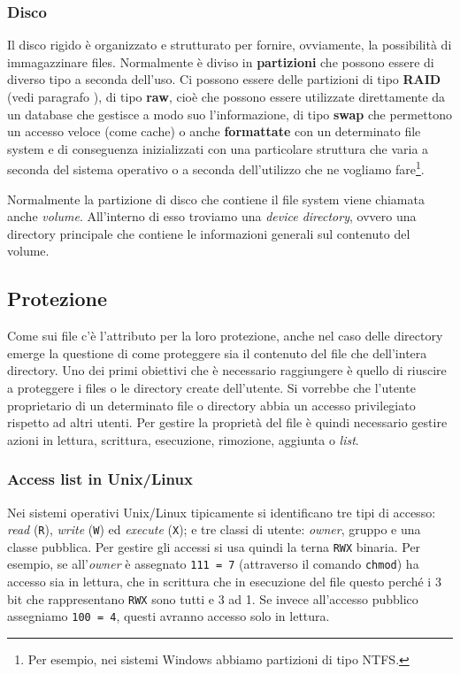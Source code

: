 % 
\subsubsection{Disco}
Il disco rigido è organizzato e strutturato per fornire, ovviamente, la possibilità di immagazzinare files. Normalmente è diviso in \textbf{partizioni} che possono essere di diverso tipo a seconda dell'uso. Ci possono essere delle partizioni di tipo \textbf{RAID} (vedi paragrafo ), di tipo \textbf{raw}, cioè che possono essere utilizzate direttamente da un database che gestisce a modo suo l'informazione, di tipo \textbf{swap} che permettono un accesso veloce (come cache) o anche \textbf{formattate} con un determinato file system e di conseguenza inizializzati con una particolare struttura che varia a seconda del sistema operativo o a seconda dell'utilizzo che ne vogliamo fare\footnote{Per esempio, nei sistemi Windows abbiamo partizioni di tipo NTFS.}.

Normalmente la partizione di disco che contiene il file system viene chiamata anche \textit{volume}. All'interno di esso troviamo una \textit{device directory}, ovvero una directory principale che contiene le informazioni generali sul contenuto del volume.

% 
\subsection{Protezione}\label{protection}
Come sui file c'è l'attributo per la loro protezione, anche nel caso delle directory emerge la questione di come proteggere sia il contenuto del file che dell'intera directory. Uno dei primi obiettivi che è necessario raggiungere è quello di riuscire a proteggere i files o le directory create dell'utente. Si vorrebbe che l'utente proprietario di un determinato file o directory abbia un accesso privilegiato rispetto ad altri utenti. Per gestire la proprietà del file è quindi necessario gestire azioni in lettura, scrittura, esecuzione, rimozione, aggiunta o \textit{list}.

\subsubsection{Access list in Unix/Linux}\label{permissions}
Nei sistemi operativi Unix/Linux tipicamente si identificano tre tipi di accesso: \textit{read} (\texttt{R}), \textit{write} (\texttt{W}) ed \textit{execute} (\texttt{X}); e tre classi di utente: \textit{owner}, gruppo e una classe pubblica. Per gestire gli accessi si usa quindi la terna \texttt{RWX} binaria. Per esempio, se all'\textit{owner} è assegnato \texttt{111 = 7} (attraverso il comando \texttt{chmod}) ha accesso sia in lettura, che in scrittura che in esecuzione del file questo perché i 3 bit che rappresentano \texttt{RWX} sono tutti e 3 ad 1. Se invece all'accesso pubblico assegniamo \texttt{100 = 4}, questi avranno accesso solo in lettura.
